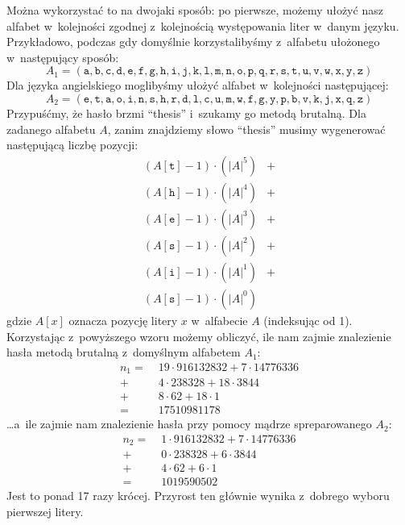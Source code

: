 \documentclass[12pt,a4paper,twoside]{article}
\begin{document}

Można wykorzystać to na
dwojaki sposób: po pierwsze, możemy ułożyć nasz alfabet w~kolejności zgodnej
z~kolejnością występowania liter w~danym języku. Przykładowo, podczas gdy
domyślnie korzystalibyśmy z~alfabetu ułożonego w~następujący sposób:
    $$A_1 = (
    \mathtt{a}, \mathtt{b}, \mathtt{c}, \mathtt{d}, \mathtt{e}, \mathtt{f},
    \mathtt{g}, \mathtt{h}, \mathtt{i}, \mathtt{j}, \mathtt{k}, \mathtt{l},
    \mathtt{m}, \mathtt{n}, \mathtt{o}, \mathtt{p}, \mathtt{q}, \mathtt{r},
    \mathtt{s}, \mathtt{t}, \mathtt{u}, \mathtt{v}, \mathtt{w}, \mathtt{x},
    \mathtt{y}, \mathtt{z})$$
Dla języka angielskiego moglibyśmy ułożyć alfabet w~kolejności
następującej:
    $$A_2 = (
    \mathtt{e}, \mathtt{t}, \mathtt{a}, \mathtt{o}, \mathtt{i}, \mathtt{n},
    \mathtt{s}, \mathtt{h}, \mathtt{r}, \mathtt{d}, \mathtt{l}, \mathtt{c},
    \mathtt{u}, \mathtt{m}, \mathtt{w}, \mathtt{f}, \mathtt{g}, \mathtt{y},
    \mathtt{p}, \mathtt{b}, \mathtt{v}, \mathtt{k}, \mathtt{j}, \mathtt{x},
    \mathtt{q}, \mathtt{z})$$
Przypuśćmy, że hasło brzmi ``thesis'' i~szukamy go metodą brutalną. Dla
zadanego alfabetu $A$, zanim znajdziemy słowo ``thesis'' musimy wygenerować
następującą liczbę pozycji:
    \[
        \begin{aligned}
        (A[\mathtt{t}]-1)\cdot(|A|^5) &+\\
        (A[\mathtt{h}]-1)\cdot(|A|^4) &+\\
        (A[\mathtt{e}]-1)\cdot(|A|^3) &+\\
        (A[\mathtt{s}]-1)\cdot(|A|^2) &+\\
        (A[\mathtt{i}]-1)\cdot(|A|^1) &+\\
        (A[\mathtt{s}]-1)\cdot(|A|^0)
        \end{aligned}
    \]
gdzie $A[x]$ oznacza pozycję litery $x$ w~alfabecie $A$ (indeksując od 1).
Korzystając z~powyższego wzoru możemy obliczyć, ile nam zajmie znalezienie
hasła metodą brutalną z~domyślnym alfabetem $A_1$:
    \[
        \begin{aligned}
        n_1=\;&19 \cdot \num{916132832} + 7 \cdot \num{14776336}\\
        +\;&4 \cdot \num{238328} + 18 \cdot \num{3844}\\
        +\;&8 \cdot \num{62} + 18 \cdot \num{1}\\
        =\;&\num{17510981178}
        \end{aligned}
    \]
\ldots a~ile zajmie nam znalezienie hasła przy pomocy mądrze spreparowanego
$A_2$:
    \[
        \begin{aligned}
        n_2=\;&1 \cdot \num{916132832} + 7 \cdot \num{14776336}\\
        +\;&0 \cdot \num{238328} + 6 \cdot \num{3844}\\
        +\;&4 \cdot \num{62} + 6 \cdot \num{1}\\
        =\;&\num{1019590502}
        \end{aligned}
    \]
Jest to ponad 17 razy krócej. Przyrost ten głównie wynika z~dobrego wyboru
pierwszej litery.
\end{document}
